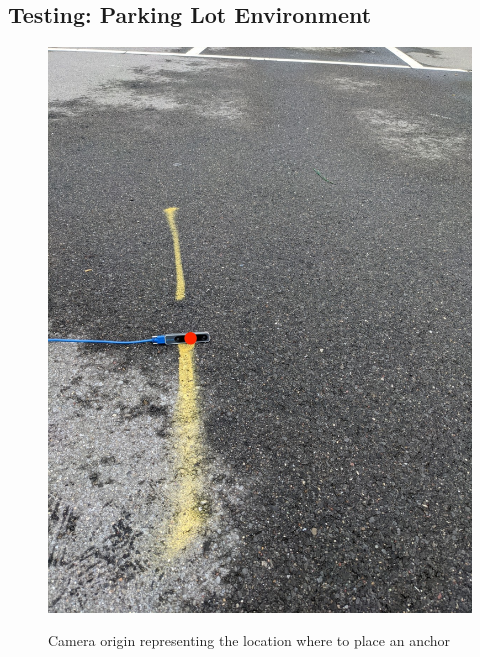 \clearpage

\subsection{Testing: Parking Lot Environment}\label{subsec:parking_lot}

\begin{figure}[ht]
    \centering
    \includegraphics[scale = 0.28]{images/colocalization/parking_lot_start.jpg}
    \label{fig:parking_lot_start}
    \caption{Camera origin representing the location where to place an anchor}
\end{figure}
\clearpage

